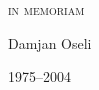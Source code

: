 \graphicspath{{img/}}





\cleardoublepage
\thispagestyle{empty}

\vspace*{55pt}

\begin{centering}

{\textsc{in memoriam}
 \par}

\vspace{.5cm}

{Damjan Oseli 
 \par}

{1975--2004
 \par}

\end{centering}

\vfill






\cleardoublepage
\thispagestyle{empty}

\vspace*{55pt}

